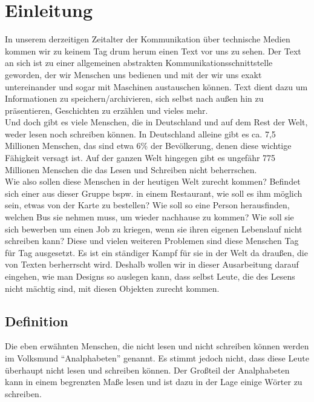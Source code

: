 \section{Einleitung}


In unserem derzeitigen Zeitalter der Kommunikation über technische Medien kommen wir zu keinem Tag drum herum einen Text vor uns zu sehen. Der Text an sich ist zu einer allgemeinen abstrakten Kommunikationsschnittstelle geworden, der wir Menschen uns bedienen und mit der wir uns exakt untereinander und sogar mit Maschinen austauschen können. Text dient dazu um Informationen zu speichern/archivieren, sich selbst nach außen hin zu präsentieren, Geschichten zu erzählen und vieles mehr.\\

Und doch gibt es viele Menschen, die in Deutschland und auf dem Rest der Welt, weder lesen noch schreiben können. In Deutschland alleine gibt es ca. 7,5 Millionen Menschen, das sind etwa 6\% der Bevölkerung, denen diese wichtige Fähigkeit versagt ist. Auf der ganzen Welt hingegen gibt es ungefähr 775 Millionen Menschen die das Lesen und Schreiben nicht beherrschen. \\

 Wie also sollen diese Menschen in der heutigen Welt zurecht kommen? Befindet sich einer aus dieser Gruppe bspw. in einem Restaurant, wie soll es ihm möglich sein, etwas von der Karte zu bestellen? Wie soll so eine Person herausfinden, welchen Bus sie nehmen muss, um wieder nachhause zu kommen? Wie soll sie sich bewerben um einen Job zu kriegen, wenn sie ihren eigenen Lebenslauf nicht schreiben kann? Diese und vielen weiteren Problemen sind diese Menschen Tag für Tag ausgesetzt. Es ist ein ständiger Kampf für sie in der Welt da draußen, die von Texten berherrscht wird. Deshalb wollen wir in dieser Ausarbeitung darauf eingehen, wie man Designs so auslegen kann, dass selbst Leute, die des Lesens nicht mächtig sind, mit diesen Objekten zurecht kommen.


\subsection{Definition}


Die eben erwähnten Menschen, die nicht lesen und nicht schreiben können werden im Volksmund "`Analphabeten"' genannt. Es stimmt jedoch nicht, dass diese Leute überhaupt nicht lesen und schreiben können. Der Großteil der Analphabeten kann in einem begrenzten Maße lesen und ist dazu in der Lage einige Wörter zu schreiben.\\

